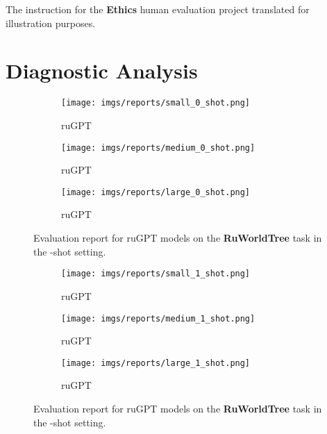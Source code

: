 \documentclass[11pt]{article}
\begin{document}
\begin{table*}[t!]
\begin{minipage}[t]{.43\linewidth}
\caption{The instruction for the \textbf{Ethics} human evaluation project translated for illustration purposes.}

\label{tab:ethics2}
\end{minipage}

\end{table*}  
\clearpage
\newpage


\onecolumn
\section{Diagnostic Analysis}
\label{app:subpopulations}
\begin{figure*}[htb!]
    \centering
    \begin{subfigure}[b]{0.72\textwidth}
        \texttt{[image: imgs/reports/small\_0\_shot.png]}
        \caption{ruGPT}
    \end{subfigure}
    \begin{subfigure}[b]{0.72\textwidth}
        \texttt{[image: imgs/reports/medium\_0\_shot.png]}
        \caption{ruGPT}
    \end{subfigure}
    \begin{subfigure}[b]{0.72\textwidth}
        \texttt{[image: imgs/reports/large\_0\_shot.png]}
        \caption{ruGPT}
    \end{subfigure}
    \caption{Evaluation report for ruGPT models on the \textbf{RuWorldTree} task in the -shot setting.}
    \label{fig:report0}
\end{figure*}

\begin{figure*}[p!]
    \centering
    \begin{subfigure}[b]{0.75\textwidth}
        \texttt{[image: imgs/reports/small\_1\_shot.png]}
        \caption{ruGPT}
    \end{subfigure}
    \begin{subfigure}[b]{0.75\textwidth}
        \texttt{[image: imgs/reports/medium\_1\_shot.png]}
        \caption{ruGPT}
    \end{subfigure}
    \begin{subfigure}[b]{0.75\textwidth}
        \texttt{[image: imgs/reports/large\_1\_shot.png]}
        \caption{ruGPT}
    \end{subfigure}
    \caption{Evaluation report for ruGPT models on the \textbf{RuWorldTree} task in the -shot setting.}
    \label{fig:report1}
\end{figure*}
\end{document}
